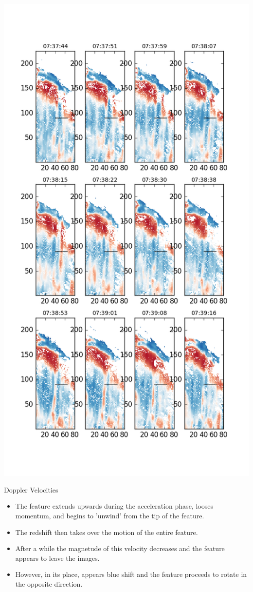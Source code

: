 \documentclass{beamer}
\begin{document}
	\begin{frame}
		\includegraphics[scale=0.5]{Figs/dopplergram.png}
	\end{frame}

	\begin{frame}{Doppler Velocities}
		\begin{itemize}
			\item{The feature extends upwards during the acceleration phase, looses momentum, and begins to 'unwind' from the tip of the feature.}
			\item{The redshift then takes over the motion of the entire feature.}
			\item{After a while the magnetude of this velocity decreases and the feature appears to leave the images.}
			\item{However, in its place, appears blue shift and the feature proceeds to rotate in the opposite direction.}
		\end{itemize}
	\end{frame}
\end{document}
